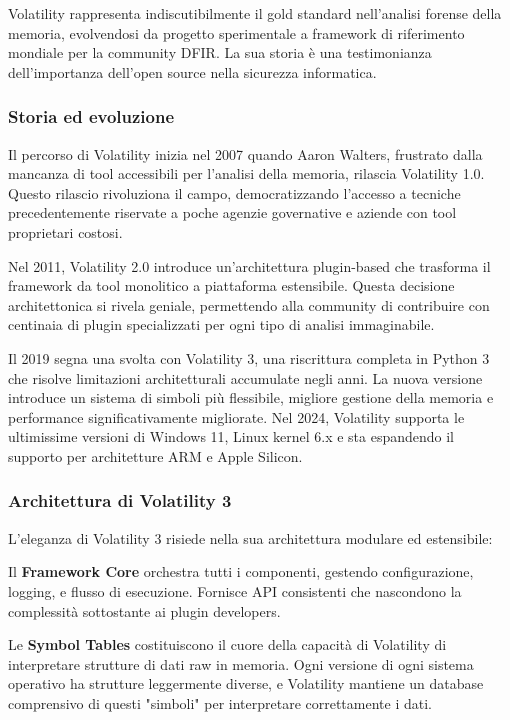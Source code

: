 Volatility \cite{volatility2024} rappresenta indiscutibilmente il gold standard nell'analisi forense della memoria, evolvendosi da progetto sperimentale a framework di riferimento mondiale per la community DFIR. La sua storia è una testimonianza dell'importanza dell'open source nella sicurezza informatica.

\subsubsection{Storia ed evoluzione}
Il percorso di Volatility inizia nel 2007 quando Aaron Walters, frustrato dalla mancanza di tool accessibili per l'analisi della memoria, rilascia Volatility 1.0. Questo rilascio rivoluziona il campo, democratizzando l'accesso a tecniche precedentemente riservate a poche agenzie governative e aziende con tool proprietari costosi.

Nel 2011, Volatility 2.0 introduce un'architettura plugin-based che trasforma il framework da tool monolitico a piattaforma estensibile. Questa decisione architettonica si rivela geniale, permettendo alla community di contribuire con centinaia di plugin specializzati per ogni tipo di analisi immaginabile.

Il 2019 segna una svolta con Volatility 3, una riscrittura completa in Python 3 che risolve limitazioni architetturali accumulate negli anni. La nuova versione introduce un sistema di simboli più flessibile, migliore gestione della memoria e performance significativamente migliorate. Nel 2024, Volatility supporta le ultimissime versioni di Windows 11, Linux kernel 6.x e sta espandendo il supporto per architetture ARM e Apple Silicon.

\subsubsection{Architettura di Volatility 3}
L'eleganza di Volatility 3 risiede nella sua architettura modulare ed estensibile:

Il \textbf{Framework Core} orchestra tutti i componenti, gestendo configurazione, logging, e flusso di esecuzione. Fornisce API consistenti che nascondono la complessità sottostante ai plugin developers.

Le \textbf{Symbol Tables} costituiscono il cuore della capacità di Volatility di interpretare strutture di dati raw in memoria. Ogni versione di ogni sistema operativo ha strutture leggermente diverse, e Volatility mantiene un database comprensivo di questi "simboli" per interpretare correttamente i dati.

